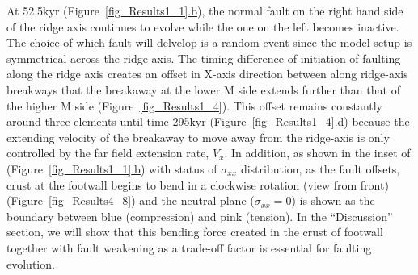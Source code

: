 At 52.5kyr (Figure~\hyperref[fig_Results1_1]{\ref{fig_Results1_1}.b}), the normal fault on the right hand side of the ridge axis continues to evolve while the one on the left becomes inactive. The choice of which fault will delvelop is a random event since the model setup is symmetrical across the ridge-axis. The timing difference of initiation of faulting along the ridge axis creates an offset in X-axis direction between along ridge-axis breakways that the breakaway at the lower M side extends further than that of the higher M side (Figure~\hyperref[fig_Results1_4]{\ref{fig_Results1_4}}). This offset remains constantly around three elements until time 295kyr (Figure~\hyperref[fig_Results1_4]{\ref{fig_Results1_4}.d}) because the extending velocity of the breakaway to move away from the ridge-axis is only controlled by the far field extension rate, $V_{x}$.  In addition, as shown in the inset of (Figure~\hyperref[fig_Results1_1]{\ref{fig_Results1_1}.b}) with status of $\sigma_{xx}$ distribution, as the fault offsets, crust at the footwall begins to bend in a clockwise rotation (view from front) (Figure~\hyperref[fig_Results4_8]{\ref{fig_Results4_8}}) and the neutral plane ($\sigma_{xx}=0$) is shown as the boundary between blue (compression) and pink (tension). In the ``Discussion'' section, we will show that this bending force created in the crust of footwall together with fault weakening as a trade-off factor is essential for faulting evolution. 

